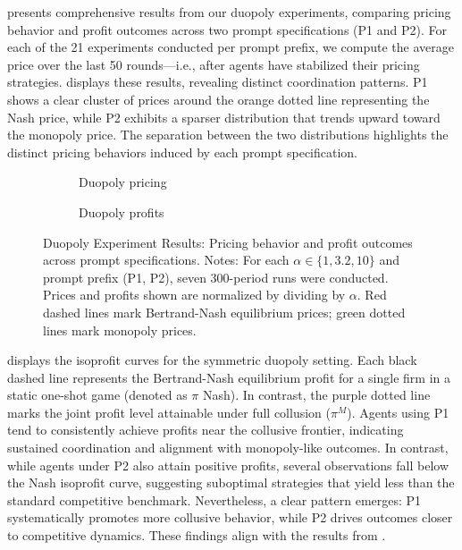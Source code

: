  presents comprehensive results from our duopoly experiments, comparing pricing behavior and profit outcomes across two prompt specifications (P1 and P2). For each of the 21 experiments conducted per prompt prefix, we compute the average price over the last 50 rounds—i.e., after agents have stabilized their pricing strategies.  displays these results, revealing distinct coordination patterns. P1 shows a clear cluster of prices around the orange dotted line representing the Nash price, while P2 exhibits a sparser distribution that trends upward toward the monopoly price. The separation between the two distributions highlights the distinct pricing behaviors induced by each prompt specification.

\begin{figure}[htpb!]
    \centering
    \begin{subfigure}[b]{0.475\linewidth}
    
    \caption{Duopoly pricing}
    \label{fig:duopoly_1}
    \end{subfigure}
    \hfill
    \begin{subfigure}[b]{0.475\linewidth}
    
    \caption{Duopoly profits}
    \label{fig:duopoly_2}
    \end{subfigure}
    \caption{Duopoly Experiment Results: Pricing behavior and profit outcomes across prompt specifications. Notes: For each $\alpha \in \{1, 3.2, 10\}$ and prompt prefix (P1, P2), seven 300-period runs were conducted. Prices and profits shown are normalized by dividing by $\alpha$. Red dashed lines mark Bertrand-Nash equilibrium prices; green dotted lines mark monopoly prices.}
    \label{fig:duopoly}
\end{figure}

 displays the isoprofit curves for the symmetric duopoly setting. Each black dashed line represents the Bertrand-Nash equilibrium profit for a single firm in a static one-shot game (denoted as $\pi$ Nash). In contrast, the purple dotted line marks the joint profit level attainable under full collusion ($\pi^M$). Agents using P1 tend to consistently achieve profits near the collusive frontier, indicating sustained coordination and alignment with monopoly-like outcomes. In contrast, while agents under P2 also attain positive profits, several observations fall below the Nash isoprofit curve, suggesting suboptimal strategies that yield less than the standard competitive benchmark. Nevertheless, a clear pattern emerges: P1 systematically promotes more collusive behavior, while P2 drives outcomes closer to competitive dynamics. These findings align with the results from \textcite{fish_algorithmic_2025}.

